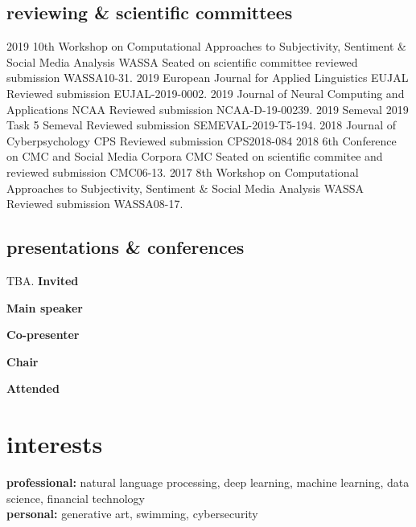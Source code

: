 \documentclass[]{friggeri-cv-a4}
\begin{document}
\subsection{reviewing \& scientific committees}
\begin{entrylist}
    \entry
        {2019}
        {10th Workshop on Computational Approaches to Subjectivity, Sentiment \& Social Media Analysis}
        {WASSA}
        {Seated on scientific committee reviewed submission WASSA10-31.}
    \entry
        {2019}
        {European Journal for Applied Linguistics}
        {EUJAL}
        {Reviewed submission EUJAL-2019-0002.}
    \entry
        {2019}
        {Journal of Neural Computing and Applications}
        {NCAA}
        {Reviewed submission NCAA-D-19-00239.}
    \entry
        {2019}
        {Semeval 2019 Task 5}
        {Semeval}
        {Reviewed submission SEMEVAL-2019-T5-194.}
    \entry
        {2018}
        {Journal of Cyberpsychology}
        {CPS}
        {Reviewed submission CPS2018-084}
    \entry
        {2018}
        {6th Conference on CMC and Social Media Corpora}
        {CMC}
        {Seated on scientific commitee and reviewed submission CMC06-13.}
    \entry
        {2017}
        {8th Workshop on Computational Approaches to Subjectivity, Sentiment \& Social Media Analysis}
        {WASSA}
        {Reviewed submission WASSA08-17.}
\end{entrylist}

\subsection{presentations \& conferences}
TBA.
\textbf{Invited}

\textbf{Main speaker}

\textbf{Co-presenter}

\textbf{Chair}

\textbf{Attended}

\section{interests}

\textbf{professional:} natural language processing, deep learning, machine learning, data science, financial technology \\
\textbf{personal:} generative art, swimming, cybersecurity
\end{document}

